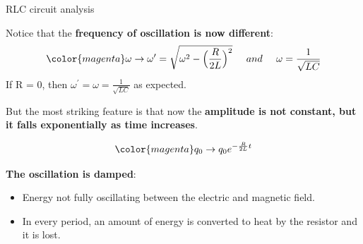 %
%
%

\begin{frame}{RLC circuit analysis}

Notice that the {\bf frequency of oscillation is now different}:
\begin{equation*}
   {\color{magenta}
       \omega \rightarrow \omega^{\prime} = \sqrt{\omega^2 - \Big( \frac{R}{2L} \Big)^2}
    }
    \;\;\;\;\; and \;\;\;\;\;
    \omega = \frac{1}{\sqrt{LC}}
\end{equation*}
If R = 0, then $ \omega^{\prime} =  \omega = \frac{1}{\sqrt{LC}}$ as expected.

\vspace{0.5cm}

But the most striking feature is that now the {\bf amplitude is not constant,
but it falls exponentially as time increases}.

\begin{equation*}
{\color{magenta}
    q_0  \rightarrow q_0 e^{-\frac{R}{2L}t}
}
\end{equation*}

{\bf The oscillation is damped}:
\begin{itemize}
  \item Energy not fully oscillating between the electric and magnetic field.
  \item In every period, an amount of energy is converted to heat by the resistor and it is lost.
\end{itemize}

\end{frame}


%
%
%

